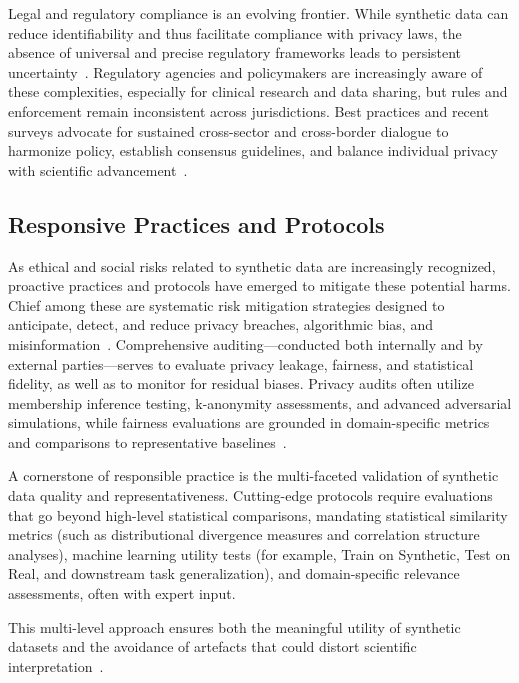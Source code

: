 \documentclass[sigconf]{acmart}
\begin{document}
Legal and regulatory compliance is an evolving frontier. While synthetic data can reduce identifiability and thus facilitate compliance with privacy laws, the absence of universal and precise regulatory frameworks leads to persistent uncertainty~\cite{ref2}\cite{ref7}\cite{ref10}\cite{ref13}. Regulatory agencies and policymakers are increasingly aware of these complexities, especially for clinical research and data sharing, but rules and enforcement remain inconsistent across jurisdictions. Best practices and recent surveys advocate for sustained cross-sector and cross-border dialogue to harmonize policy, establish consensus guidelines, and balance individual privacy with scientific advancement~\cite{ref3}\cite{ref7}\cite{ref14}\cite{ref17}\cite{ref21}\cite{ref88}.

\subsection{Responsive Practices and Protocols}

As ethical and social risks related to synthetic data are increasingly recognized, proactive practices and protocols have emerged to mitigate these potential harms. Chief among these are systematic risk mitigation strategies designed to anticipate, detect, and reduce privacy breaches, algorithmic bias, and misinformation~\cite{ref81}\cite{ref82}\cite{ref88}. Comprehensive auditing—conducted both internally and by external parties—serves to evaluate privacy leakage, fairness, and statistical fidelity, as well as to monitor for residual biases. Privacy audits often utilize membership inference testing, k-anonymity assessments, and advanced adversarial simulations, while fairness evaluations are grounded in domain-specific metrics and comparisons to representative baselines~\cite{ref12}\cite{ref81}\cite{ref82}.

A cornerstone of responsible practice is the multi-faceted validation of synthetic data quality and representativeness. Cutting-edge protocols require evaluations that go beyond high-level statistical comparisons, mandating statistical similarity metrics (such as distributional divergence measures and correlation structure analyses), machine learning utility tests (for example, Train on Synthetic, Test on Real, and downstream task generalization), and domain-specific relevance assessments, often with expert input.

This multi-level approach ensures both the meaningful utility of synthetic datasets and the avoidance of artefacts that could distort scientific interpretation~\cite{ref6}\cite{ref11}\cite{ref75}\cite{ref81}\cite{ref89}.
\end{document}
